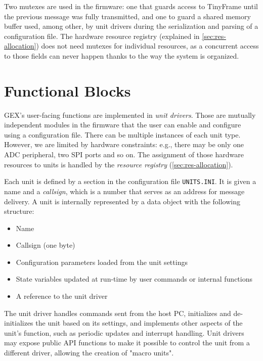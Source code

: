 Two mutexes are used in the firmware: one that guards access to TinyFrame until the previous message was fully transmitted, and one to guard a shared memory buffer used, among other, by unit drivers during the serialization and parsing of a configuration file. The hardware resource registry (explained in \ref{sec:res-allocation}) does not need mutexes for individual resources, as a concurrent access to those fields can never happen thanks to the way the system is organized.

\section{Functional Blocks} \label{sec:units-function}

GEX's user-facing functions are implemented in \textit{unit drivers}. Those are mutually independent modules in the firmware that the user can enable and configure using a configuration file. There can be multiple instances of each unit type. However, we are limited by hardware constraints: e.g., there may be only one \gls{ADC} peripheral, two \gls{SPI} ports and so on. The assignment of those hardware resources to units is handled by the \textit{resource registry} (\ref{sec:res-allocation}).

Each unit is defined by a section in the configuration file \verb|UNITS.INI|. It is given a name and a \textit{callsign}, which is a number that serves as an address for message delivery. A unit is internally represented by a data object with the following structure:

\begin{itemize}
	\item Name
	\item Callsign (one byte)
	\item Configuration parameters loaded from the unit settings
	\item State variables updated at run-time by user commands or internal functions
	\item A reference to the unit driver
\end{itemize}

The unit driver handles commands sent from the host \gls{PC}, initializes and de-initializes the unit based on its settings, and implements other aspects of the unit's function, such as periodic updates and interrupt handling. Unit drivers may expose public \gls{API} functions to make it possible to control the unit from a different driver, allowing the creation of "macro units".

